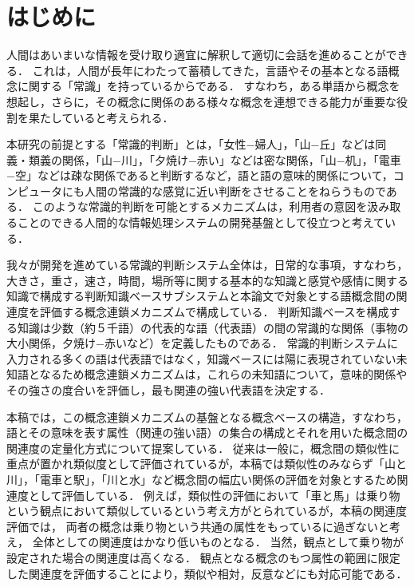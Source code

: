 

\maketitle



\section{はじめに}

人間はあいまいな情報を受け取り適宜に解釈して適切に会話を進めることができる．
これは，人間が長年にわたって蓄積してきた，言語やその基本となる語概念に関する「常識」を持っているからである．
すなわち，ある単語から概念を想起し，さらに，その概念に関係のある様々な概念を連想できる能力が重要な役割を果たしていると考えられる．

本研究の前提とする「常識的判断」とは，「女性−婦人」，「山−丘」などは同義・類義の関係，「山−川」，「夕焼け−赤い」などは密な関係，「山−机」，「電車−空」などは疎な関係であると判断するなど，語と語の意味的関係について，コンピュータにも人間の常識的な感覚に近い判断をさせることをねらうものである．
このような常識的判断を可能とするメカニズムは，利用者の意図を汲み取ることのできる人間的な情報処理システムの開発基盤として役立つと考えている．

我々が開発を進めている常識的判断システム全体は，日常的な事項，すなわち，大きさ，重さ，速さ，時間，場所等に関する基本的な知識\cite{Kikuyama,Obata}と感覚や感情に関する知識\cite{Baba,Hanada,Tsutiya}で構成する判断知識ベースサブシステムと本論文で対象とする語概念間の関連度を評価する概念連鎖メカニズムで構成している．
判断知識ベースを構成する知識は少数（約５千語）の代表的な語（代表語）の間の常識的な関係（事物の大小関係，夕焼け−赤いなど）を定義したものである．
常識的判断システムに入力される多くの語は代表語ではなく，知識ベースには陽に表現されていない未知語となるため概念連鎖メカニズムは，これらの未知語について，意味的関係やその強さの度合いを評価し，最も関連の強い代表語を決定する． 

本稿では，この概念連鎖メカニズムの基盤となる概念ベースの構造，すなわち，語とその意味を表す属性（関連の強い語）の集合の構成とそれを用いた概念間の関連度の定量化方式について提案している．
従来は一般に，概念間の類似性に重点が置かれ類似度として評価されているが，本稿では類似性のみならず「山と川」，「電車と駅」，「川と水」など概念間の幅広い関係の評価を対象とするため関連度として評価している．
例えば，類似性の評価において「車と馬」は乗り物という観点において類似しているという考え方がとられているが，本稿の関連度評価では，
両者の概念は乗り物という共通の属性をもっているに過ぎないと考え，
全体としての関連度はかなり低いものとなる．
当然，観点として乗り物が設定された場合の関連度は高くなる．
観点となる概念のもつ属性の範囲に限定した関連度を評価する\cite{Irie2}ことにより，類似や相対，反意などにも対応可能である．

